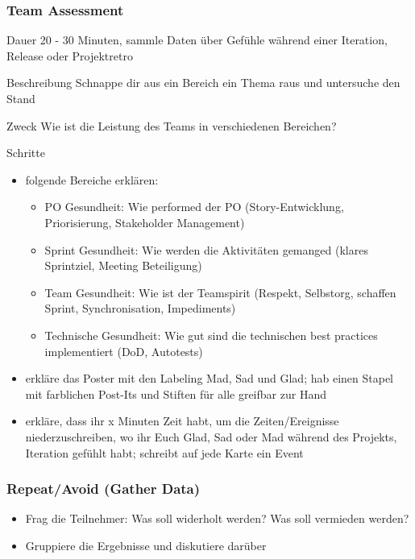 \subsubsection{Team Assessment}
\begin{Beschreibungfett}[Beschreibung]
  \item [Dauer] 20 - 30 Minuten, sammle Daten über Gefühle während einer Iteration,
    Release oder Projektretro
  \item [Beschreibung] Schnappe dir aus ein Bereich ein Thema raus und untersuche den Stand
  \item [Zweck] Wie ist die Leistung des Teams in verschiedenen Bereichen?
  \item [Schritte]
    \begin{itemize}
      \item folgende Bereiche erklären:
        \begin{itemize}
          \item PO Gesundheit: Wie performed der PO (Story-Entwicklung, Priorisierung, Stakeholder
            Management)
          \item Sprint Gesundheit: Wie werden die Aktivitäten gemanged (klares Sprintziel, Meeting
            Beteiligung)
          \item Team Gesundheit: Wie ist der Teamspirit (Respekt, Selbstorg, schaffen Sprint,
            Synchronisation, Impediments)
          \item Technische Gesundheit: Wie gut sind die technischen best practices implementiert
            (DoD, Autotests)
        \end{itemize}
      \item erkläre das Poster mit den Labeling Mad, Sad und Glad; hab einen Stapel mit
        farblichen Post-Its und Stiften für alle greifbar zur Hand
      \item erkläre, dass ihr x Minuten Zeit habt, um die Zeiten/Ereignisse niederzuschreiben, wo
        ihr Euch Glad, Sad oder Mad während des Projekts, Iteration gefühlt habt; schreibt auf jede Karte ein Event
    \end{itemize}
\end{Beschreibungfett}


\subsubsection{Repeat/Avoid (Gather Data)}
\begin{itemize}
  \item Frag die Teilnehmer: Was soll widerholt werden? Was soll vermieden werden?
  \item Gruppiere die Ergebnisse und diskutiere darüber
\end{itemize}


